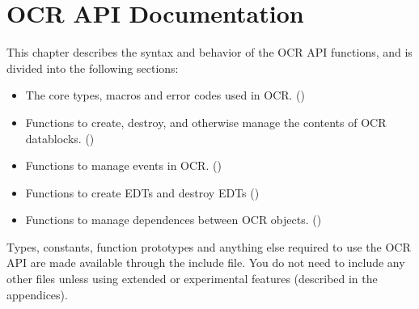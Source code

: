 %

\chapter{OCR API Documentation}
\label{chap:OCRAPI}


This chapter describes the syntax and behavior of the OCR API functions, and is divided
into the following sections:

\begin{itemize}
\item The core types, macros and error codes used in OCR.
()

\item Functions to create, destroy, and otherwise manage the contents of OCR datablocks.
()

\item Functions to manage events in OCR.
()

\item Functions to create EDTs and  destroy EDTs
()

\item Functions to manage dependences between OCR objects.
()

\end{itemize}

Types, constants, function prototypes and anything else required to use the
OCR API are made available through the  include file.  You do not
need to include any other files unless using extended or experimental
features (described in the appendices).


